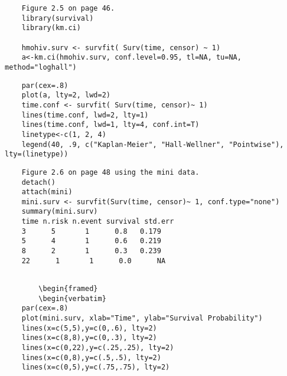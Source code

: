 \begin{frame}[fragile]
	
	\begin{framed}
		\begin{verbatim}
	Figure 2.5 on page 46.
	library(survival)
	library(km.ci)
	
	hmohiv.surv <- survfit( Surv(time, censor) ~ 1)
	a<-km.ci(hmohiv.surv, conf.level=0.95, tl=NA, tu=NA, method="loghall")
\end{verbatim}
\end{framed}
\end{frame}
\begin{frame}[fragile]
	
	\begin{framed}
		\begin{verbatim}
	par(cex=.8)
	plot(a, lty=2, lwd=2)
	time.conf <- survfit( Surv(time, censor)~ 1)
	lines(time.conf, lwd=2, lty=1)
	lines(time.conf, lwd=1, lty=4, conf.int=T)
	linetype<-c(1, 2, 4)
	legend(40, .9, c("Kaplan-Meier", "Hall-Wellner", "Pointwise"), lty=(linetype))
\end{verbatim}
\end{framed}
\end{frame}
\begin{frame}[fragile]
	
	\begin{framed}
		\begin{verbatim}
	Figure 2.6 on page 48 using the mini data.
	detach()
	attach(mini)
	mini.surv <- survfit(Surv(time, censor)~ 1, conf.type="none")
	summary(mini.surv)
	time n.risk n.event survival std.err
	3      5       1      0.8   0.179
	5      4       1      0.6   0.219
	8      2       1      0.3   0.239
	22      1       1      0.0      NA
\end{verbatim}
\end{framed}
\end{frame}
\begin{frame}[fragile]
	
	\begin{framed}
		\begin{verbatim}	
	
		\begin{framed}
		\begin{verbatim}
	par(cex=.8)
	plot(mini.surv, xlab="Time", ylab="Survival Probability")
	lines(x=c(5,5),y=c(0,.6), lty=2) 
	lines(x=c(8,8),y=c(0,.3), lty=2)
	lines(x=c(0,22),y=c(.25,.25), lty=2) 
	lines(x=c(0,8),y=c(.5,.5), lty=2)
	lines(x=c(0,5),y=c(.75,.75), lty=2)

\end{verbatim}
\end{framed}

\end{frame}
